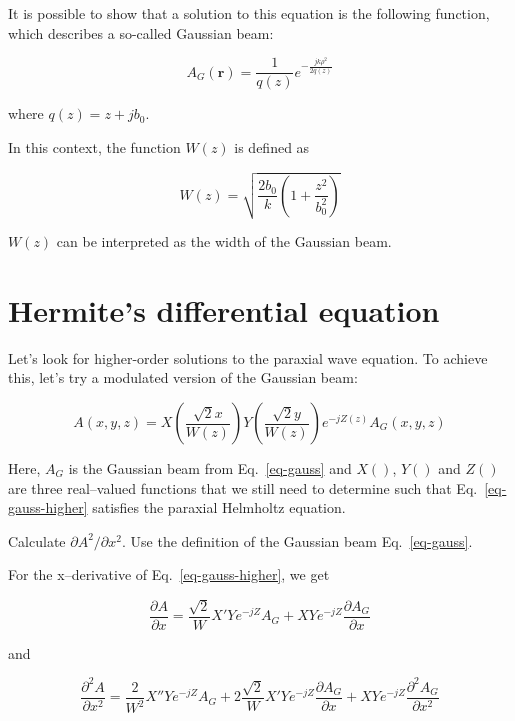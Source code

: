 It is possible to show that a solution to this equation is the following function, which describes a so-called Gaussian beam:

\begin{equation}
A_G({\mathbf r}) = \frac{1}{q(z)}e^{-\frac{jk\rho^2}{2q(z)}} \label{eq-gauss}
\end{equation}   

where $q(z)=z+jb_0$. 

In this context, the function $W(z)$ is defined as

\begin{equation}
W(z)=\sqrt{\frac{2 b_0}{k} \left(1 + \frac{z^2}{b_0^2}\right)} \label{eq-W}
\end{equation} 

$W(z)$ can be interpreted as the width of the Gaussian beam.


\pagebreak


\section{Hermite's differential equation}

Let's look for higher-order solutions to the paraxial wave equation. To achieve this, let's try a modulated version of the Gaussian beam:

\begin{equation}
A(x,y,z) = X\left({\frac{\sqrt{2}x}{W(z)}}\right) Y\left({\frac{\sqrt{2}y}{W(z)}}\right) e^{-jZ(z)} A_G(x,y,z) \label{eq-gauss-higher}
\end{equation} 

Here, $A_G$ is the Gaussian beam from Eq.~\ref{eq-gauss} and $X()$, $Y()$ and $Z()$ are three real--valued functions that we still need to determine such that Eq.~\ref{eq-gauss-higher} satisfies the paraxial Helmholtz equation.

\begin{cue}
Calculate $\partial A^2 / \partial x^2$. Use the definition of the Gaussian beam Eq.~\ref{eq-gauss}. 
\end{cue}
  
For the x--derivative of Eq.~\ref{eq-gauss-higher}, we get

\begin{equation}
\frac{\partial A}{\partial x} = \frac{\sqrt{2}}{W}X'Ye^{-jZ} A_G + XYe^{-jZ} \frac{\partial A_G}{\partial x} 
\end{equation} 

and

\begin{equation}
\frac{\partial^2 A}{\partial x^2} = \frac{2}{W^2}X''Ye^{-jZ} A_G  + 2\frac{\sqrt{2}}{W}X'Ye^{-jZ} \frac{\partial A_G}{\partial x}  + XYe^{-jZ} \frac{\partial^2 A_G}{\partial x^2}
\end{equation} 

